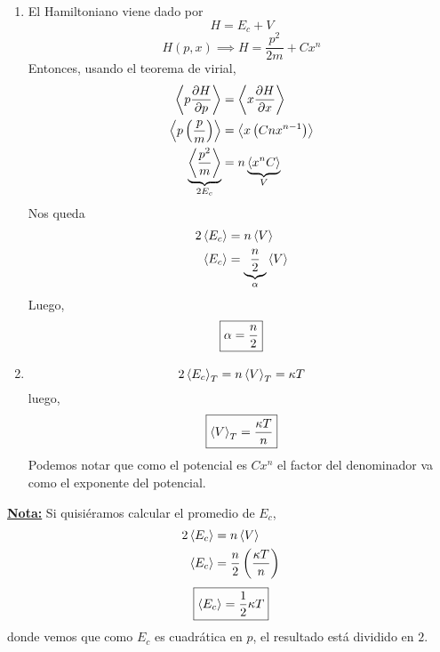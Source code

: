\begin{sol}
\begin{enumerate}
	\item
	El Hamiltoniano viene dado por
	\begin{equation}
  H=E_c+V
\end{equation}
\begin{equation}
  H(p,x)\implies H=\frac{p^2}{2m}+Cx^n
\end{equation}
Entonces, usando el teorema de virial,
\begin{align}
  \ev{p\pdv{H}{p}}&=\ev{x\pdv{H}{x}}\\
  \ev{p\left(\frac{p}{m}\right)}&=\ev{x\left(Cnx^{n-1}\right)}\\
  \underbrace{\ev{\frac{p^2}{m}}}_{2E_c}&=n\underbrace{\ev{x^nC}}_{V}
\end{align}
Nos queda
\begin{align}
  2\ev{E_c}&=n\ev{V}\\
  \ev{E_c}&=\underbrace{\frac{n}{2}}_{\a }\ev{V}
\end{align}
Luego,
\begin{equation}
\boxed{  \alpha =\frac{n}{2}}
\end{equation}
\item 
\begin{equation}
  2\ev{E_c}_T=n\ev{V}_T=\k T
\end{equation}
luego,
\begin{equation}
 \boxed{ \ev{V}_T=\frac{\k T}{n}}
\end{equation}
Podemos notar que como el potencial es $Cx^n$ el factor del denominador va como el exponente del potencial.
\end{enumerate}
\end{sol}

\underline{\textbf{Nota:}} Si quisiéramos calcular el promedio de $E_c$,
\begin{align}
  2\ev{E_c}&=n\ev{V}\\
  \ev{E_c}&=\frac{n}{2}\left(\frac{\k T}{n}\right)
\end{align}
\begin{equation}
\boxed{  \ev{E_c}=\frac{1}{2}\k T}
\end{equation}
donde vemos que como $E_c$ es cuadrática en $p$, el resultado está dividido en $2$.




















